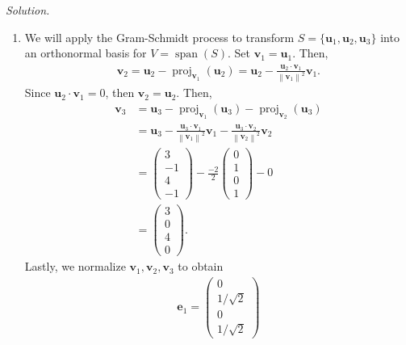 \documentclass[12pt]{article}
\begin{document}
\textit{Solution.}
\begin{enumerate}[label=\textbf{(\alph*)}]
    \itemsep 0em
    \item We will apply the Gram-Schmidt process to transform \( S = \{\mathbf{u}_1, \mathbf{u}_2, \mathbf{u}_3\} \) into an orthonormal basis for \( V = \operatorname{span}(S) \).
    \newline
    \newline Set $\mathbf{v}_1=\mathbf{u}_1$. Then, \begin{align*}
        \mathbf{v}_2=\mathbf{u}_2-\operatorname{proj}_{\mathbf{v}_1}(\mathbf{u}_2)=\mathbf{u}_2-\frac{\mathbf{u}_2\cdot \mathbf{v}_1}{\left\|\mathbf{v}_1\right\|^2}\mathbf{v}_1.
    \end{align*}
    Since $\mathbf{u}_2\cdot\mathbf{v}_1=0$, then $\mathbf{v}_2=\mathbf{u}_2$.
    \newline
    \newline Then, \begin{align*}
        \mathbf{v}_3 &= \mathbf{u}_3 - \operatorname{proj}_{\mathbf{v}_1}(\mathbf{u}_3) - \operatorname{proj}_{\mathbf{v}_2}(\mathbf{u}_3)\\
        &=\mathbf{u}_3-\frac{\mathbf{u}_3\cdot \mathbf{v}_1}{\left\|\mathbf{v}_1\right\|^2}\mathbf{v}_1-\frac{\mathbf{u}_3\cdot\mathbf{v}_2}{\left\|\mathbf{v}_2\right\|^2}\mathbf{v}_2 \\
        &=\begin{pmatrix}
            3\\-1\\4\\-1
        \end{pmatrix}-\frac{-2}{2}\begin{pmatrix}
            0\\1\\0\\1
        \end{pmatrix}-0\\
        &=\begin{pmatrix}
            3\\0\\4\\0
        \end{pmatrix}.
    \end{align*}
Lastly, we normalize $\mathbf{v}_1,\mathbf{v}_2,\mathbf{v}_3$ to obtain \begin{align*}
    \mathbf{e}_1=\begin{pmatrix}
        0\\ 1/\sqrt{2} \\ 0 \\ 1/\sqrt{2}

\end{pmatrix}
\end{align*}
\end{enumerate}
\end{document}

